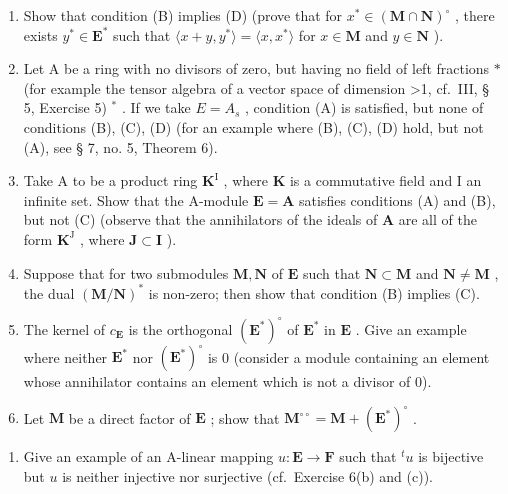 \begin{enumerate}
\def\labelenumi{(\alph{enumi})}
\item
  Show that condition (B) implies (D) (prove that for \(x^{*} \in (\mathbf{M} \cap \mathbf{N})^{\circ}\) , there exists \(y^{*} \in \mathbf{E}^{*}\) such that \(\langle x + y, y^{*} \rangle = \langle x, x^{*} \rangle\) for \(x \in \mathbf{M}\) and \(y \in \mathbf{N}\) ).
\item
  Let A be a ring with no divisors of zero, but having no field of left fractions \(*\) (for example the tensor algebra of a vector space of dimension \textgreater1, cf.~III, § 5, Exercise 5) \(^{*}\) . If we take \(E = A_{s}\) , condition (A) is satisfied, but none of conditions (B), (C), (D) (for an example where (B), (C), (D) hold, but not (A), see § 7, no. 5, Theorem 6).
\item
  Take A to be a product ring \(\mathbf{K}^{\mathrm{I}}\) , where \(\mathbf{K}\) is a commutative field and I an infinite set. Show that the A-module \(\mathbf{E} = \mathbf{A}\) satisfies conditions (A) and (B), but not (C) (observe that the annihilators of the ideals of \(\mathbf{A}\) are all of the form \(\mathbf{K}^{\mathrm{J}}\) , where \(\mathbf{J} \subset \mathbf{I}\) ).
\item
  Suppose that for two submodules \(\mathbf{M},\mathbf{N}\) of \(\mathbf{E}\) such that \(\mathbf{N} \subset \mathbf{M}\) and \(\mathbf{N} \neq \mathbf{M}\) , the dual \((\mathbf{M} / \mathbf{N})^*\) is non-zero; then show that condition (B) implies (C).
\item
  The kernel of \(c_{\mathbf{E}}\) is the orthogonal \((\mathbf{E}^{*})^{\circ}\) of \(\mathbf{E}^{*}\) in \(\mathbf{E}\) . Give an example where neither \(\mathbf{E}^{*}\) nor \((\mathbf{E}^{*})^{\circ}\) is 0 (consider a module containing an element whose annihilator contains an element which is not a divisor of 0).
\item
  Let \(\mathbf{M}\) be a direct factor of \(\mathbf{E}\) ; show that \(\mathbf{M}^{\circ \circ} = \mathbf{M} + (\mathbf{E}^{*})^{\circ}\) .
\end{enumerate}

\begin{enumerate}
\def\labelenumi{\arabic{enumi}.}
\setcounter{enumi}{9}
\tightlist
\item
  Give an example of an A-linear mapping \(u: \mathbf{E} \to \mathbf{F}\) such that \(^t u\) is bijective but \(u\) is neither injective nor surjective (cf.~Exercise 6(b) and (c)).
\end{enumerate}


